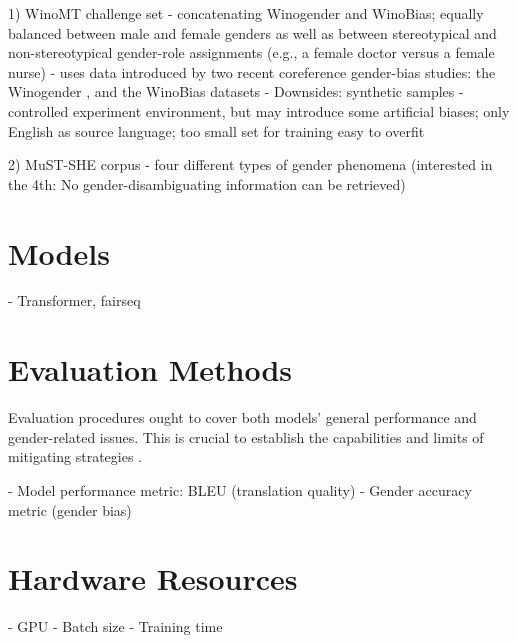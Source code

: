1) WinoMT challenge set
- concatenating Winogender and WinoBias; equally balanced between male and female genders as well as between stereotypical and non-stereotypical gender-role assignments (e.g., a female doctor versus a female nurse)
- uses data introduced by two recent coreference gender-bias studies: the
Winogender \parencite{Rudinger_2018_coreference}, and the WinoBias \cite{Zhao_2018_coreference} datasets
- Downsides: synthetic samples - controlled experiment environment, but may introduce some artificial biases; only English as source language; too small set for training easy to overfit

2) MuST-SHE corpus
- four different types of gender phenomena (interested in the 4th: No gender-disambiguating information can be retrieved)

\section{Models}
\label{sec:Experiments:Models}
- Transformer, fairseq

\section{Evaluation Methods}
\label{sec:Experiments:Evaluation}

Evaluation procedures ought to cover both models’ general performance and gender-related issues. This is crucial to establish the capabilities and limits of mitigating strategies \cite{Savoldi_2021}.

- Model performance metric: BLEU (translation quality)
- Gender accuracy metric (gender bias)


\section{Hardware Resources}
\label{sec:Experiments:Hardware}
- GPU
- Batch size
- Training time


